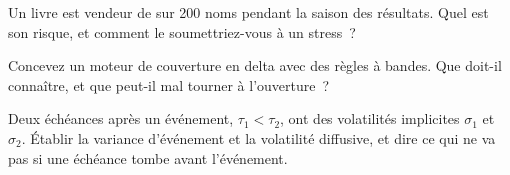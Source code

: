 \begin{interviewq}\label{iq:s2:gamma-scalping-and-event-volatility:4}
Un livre est vendeur de  sur 200 noms pendant la saison des résultats. Quel est son risque, et comment le soumettriez-vous à un stress~?
\end{interviewq}

\begin{interviewq}\label{iq:s2:gamma-scalping-and-event-volatility:5}
Concevez un moteur de couverture en delta avec des règles à bandes. Que doit-il connaître, et que peut-il mal tourner à l'ouverture~?
\end{interviewq}

\begin{interviewq}\label{iq:s2:gamma-scalping-and-event-volatility:6}
Deux échéances après un événement, $\tau_1 < \tau_2$, ont des volatilités implicites $\sigma_1$ et $\sigma_2$. Établir la variance d'événement et la volatilité diffusive, et
dire ce qui ne va pas si une échéance tombe avant l'événement.
\end{interviewq}
